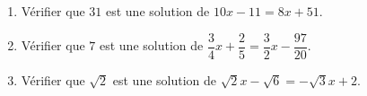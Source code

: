 \documentclass[a4paper,11pt,exos]{nsi} %
\begin{document}
\maketitle

\begin {exercice}
\begin{enumerate}
	\item Vérifier que $31$ est une solution de $10x-11 = 8x +51$.
	\item Vérifier que $7$ est une solution de $\dfrac{3}{4}x+\dfrac{2}{5}=\dfrac{3}{2}x-\dfrac{97}{20}$.
	\item Vérifier que $\sqrt{2}$ est une solution de $\sqrt{2}x-\sqrt{6}=-\sqrt{3}x+2$.	
\end{enumerate}
\end {exercice}
\end{document}
